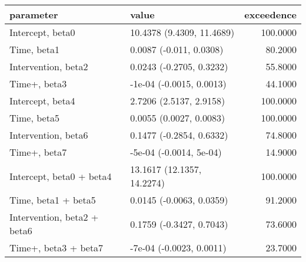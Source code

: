 \begin{table}[ht]
\centering
\begin{tabular}{llr}
  \hline
parameter & value & exceedence \\ 
  \hline
Intercept, beta0 & 10.4378 (9.4309, 11.4689) & 100.0000 \\ 
  Time, beta1 & 0.0087 (-0.011, 0.0308) & 80.2000 \\ 
  Intervention, beta2 & 0.0243 (-0.2705, 0.3232) & 55.8000 \\ 
  Time+, beta3 & -1e-04 (-0.0015, 0.0013) & 44.1000 \\ 
  Intercept, beta4 & 2.7206 (2.5137, 2.9158) & 100.0000 \\ 
  Time, beta5 & 0.0055 (0.0027, 0.0083) & 100.0000 \\ 
  Intervention, beta6 & 0.1477 (-0.2854, 0.6332) & 74.8000 \\ 
  Time+, beta7 & -5e-04 (-0.0014, 5e-04) & 14.9000 \\ 
  Intercept, beta0 + beta4 & 13.1617 (12.1357, 14.2274) & 100.0000 \\ 
  Time, beta1 + beta5 & 0.0145 (-0.0063, 0.0359) & 91.2000 \\ 
  Intervention, beta2 + beta6 & 0.1759 (-0.3427, 0.7043) & 73.6000 \\ 
  Time+, beta3 + beta7 & -7e-04 (-0.0023, 0.0011) & 23.7000 \\ 
   \hline
\end{tabular}
\end{table}
